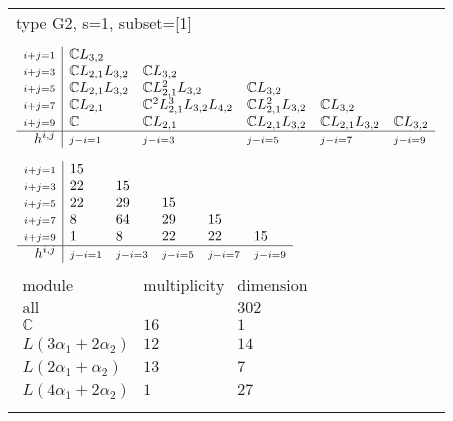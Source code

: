 \documentclass[crop,border=2mm]{standalone}
\begin{document}
\begin{tabular}{l}
{\huge type G2, s=1, subset=[1]}\\ \\


$\displaystyle
\begin{array}{r|l l l l l}
	{\scriptstyle i+j=1}&\mathbb{C}L_{3,2}&&&&\\
	{\scriptstyle i+j=3}&\mathbb{C}L_{2,1}L_{3,2}&\mathbb{C}L_{3,2}&&&\\
	{\scriptstyle i+j=5}&\mathbb{C}L_{2,1}L_{3,2}&\mathbb{C}L_{2,1}^{2}L_{3,2}&\mathbb{C}L_{3,2}&&\\
	{\scriptstyle i+j=7}&\mathbb{C}L_{2,1}&\mathbb{C}^{2}L_{2,1}^{3}L_{3,2}L_{4,2}&\mathbb{C}L_{2,1}^{2}L_{3,2}&\mathbb{C}L_{3,2}&\\
	{\scriptstyle i+j=9}&\mathbb{C}&\mathbb{C}L_{2,1}&\mathbb{C}L_{2,1}L_{3,2}&\mathbb{C}L_{2,1}L_{3,2}&\mathbb{C}L_{3,2}\\
	\hline h^{i,j}&{\scriptstyle j-i=1}&{\scriptstyle j-i=3}&{\scriptstyle j-i=5}&{\scriptstyle j-i=7}&{\scriptstyle j-i=9}
\end{array}
$ \\ \\


$\displaystyle
\begin{array}{r|l l l l l}
	{\scriptstyle i+j=1}&15&&&&\\
	{\scriptstyle i+j=3}&22&15&&&\\
	{\scriptstyle i+j=5}&22&29&15&&\\
	{\scriptstyle i+j=7}&8&64&29&15&\\
	{\scriptstyle i+j=9}&1&8&22&22&15\\
	\hline h^{i,j}&{\scriptstyle j-i=1}&{\scriptstyle j-i=3}&{\scriptstyle j-i=5}&{\scriptstyle j-i=7}&{\scriptstyle j-i=9}
\end{array}
$ \\ \\


$\displaystyle
\begin{array}{rll}
	\text{module}&\text{multiplicity}&\text{dimension} \\ \hline \text{all}&&302 \\
	\mathbb{C}&16&1\\
	L\left( 3\alpha_{1}+ 2\alpha_{2}\right)&12&14\\
	L\left( 2\alpha_{1}+\alpha_{2}\right)&13&7\\
	L\left( 4\alpha_{1}+ 2\alpha_{2}\right)&1&27
\end{array}
$ \\ \\

\end{tabular}
\end{document}

